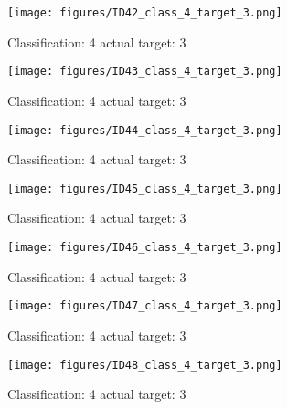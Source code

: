 \begin{figure}[h!]
\begin{center}
\texttt{[image: figures/ID42\_class\_4\_target\_3.png]}
\end{center}
\caption{ Classification: 4 actual target: 3}
\label{fig:ID42_class_4_target_3}
\end{figure}
\begin{figure}[h!]
\begin{center}
\texttt{[image: figures/ID43\_class\_4\_target\_3.png]}
\end{center}
\caption{ Classification: 4 actual target: 3}
\label{fig:ID43_class_4_target_3}
\end{figure}
\begin{figure}[h!]
\begin{center}
\texttt{[image: figures/ID44\_class\_4\_target\_3.png]}
\end{center}
\caption{ Classification: 4 actual target: 3}
\label{fig:ID44_class_4_target_3}
\end{figure}
\begin{figure}[h!]
\begin{center}
\texttt{[image: figures/ID45\_class\_4\_target\_3.png]}
\end{center}
\caption{ Classification: 4 actual target: 3}
\label{fig:ID45_class_4_target_3}
\end{figure}
\begin{figure}[h!]
\begin{center}
\texttt{[image: figures/ID46\_class\_4\_target\_3.png]}
\end{center}
\caption{ Classification: 4 actual target: 3}
\label{fig:ID46_class_4_target_3}
\end{figure}
\begin{figure}[h!]
\begin{center}
\texttt{[image: figures/ID47\_class\_4\_target\_3.png]}
\end{center}
\caption{ Classification: 4 actual target: 3}
\label{fig:ID47_class_4_target_3}
\end{figure}
\begin{figure}[h!]
\begin{center}
\texttt{[image: figures/ID48\_class\_4\_target\_3.png]}
\end{center}
\caption{ Classification: 4 actual target: 3}
\label{fig:ID48_class_4_target_3}
\end{figure}
